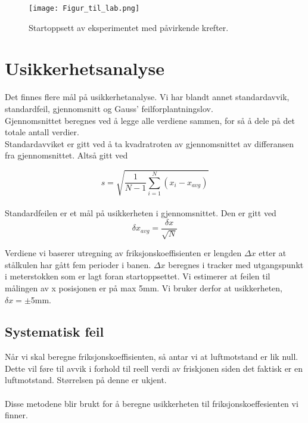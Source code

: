 \documentclass[5p,sort&compress]{elsarticle}
\begin{document}
\begin{figure}[tbp] 
\centering
\texttt{[image: Figur\_til\_lab.png]}

\caption{Startoppsett av eksperimentet med påvirkende krefter.}
\label{fig:pendel} %
\end{figure}

\section{Usikkerhetsanalyse}

Det finnes flere mål på usikkerhetanalyse. Vi har blandt annet standardavvik, standardfeil, gjennomsnitt og Gauss' feilforplantningslov.  \\
Gjennomsnittet beregnes ved å legge alle verdiene sammen, for så å dele på det totale antall verdier. \\
Standardavviket er gitt ved å ta kvadratroten av gjennomsnittet av differansen fra gjennomsnittet. Altså gitt ved 

\begin{equation}
s = \sqrt{\frac{1}{N-1}\sum\limits_{i=1}^N(x_{i}-x_{avg})}
\end{equation}
 \\


Standardfeilen er et mål på usikkerheten i gjennomsnittet. Den er gitt ved 
\begin{equation}
\delta x_{avg} = \frac{\delta x}{\sqrt{N}}
\end{equation}

Verdiene vi baserer utregning av friksjonskoeffisienten er lengden $\Delta x$ etter at stålkulen har gått fem perioder i banen.
$\Delta x$ beregnes i tracker med utgangspunkt i meterstokken som er lagt foran startoppsettet. Vi estimerer at feilen til målingen av x posisjonen er på max 5mm. Vi bruker derfor at usikkerheten, $\delta x = \pm $5mm.\\



\subsection{Systematisk feil} 
Når vi skal beregne friksjonskoeffisienten, så antar vi at luftmotstand er lik null. Dette vil føre til avvik i forhold til reell verdi av friskjonen siden det faktisk er en luftmotstand. Størrelsen på denne er ukjent.\\
\vspace{4mm}\\
Disse metodene blir brukt for å beregne usikkerheten til friksjonskoeffesienten vi finner.\\
\end{document}
